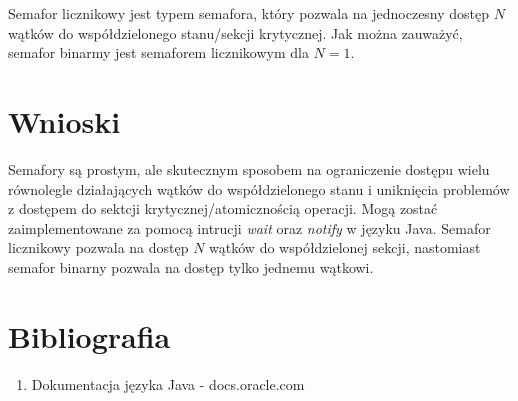\documentclass{article}
\begin{document}
Semafor licznikowy jest typem semafora, który pozwala na jednoczesny dostęp $N$ wątków do
współdzielonego stanu/sekcji krytycznej. 
Jak można zauważyć, semafor binarmy jest semaforem licznikowym dla $N=1$.

\section{Wnioski}

Semafory są prostym, ale skutecznym sposobem na ograniczenie dostępu wielu równolegle działających
wątków do współdzielonego stanu i uniknięcia problemów z dostępem do sektcji krytycznej/atomicznością operacji.
Mogą zostać zaimplementowane za pomocą intrucji \textit{wait} oraz \textit{notify} w języku Java.
Semafor licznikowy pozwala na dostęp $N$ wątków do współdzielonej sekcji, nastomiast semafor binarny pozwala
na dostęp tylko jednemu wątkowi.

\section{Bibliografia}

\begin{enumerate}
    \item 
    Dokumentacja języka Java - docs.oracle.com

\end{enumerate}
\end{document}
